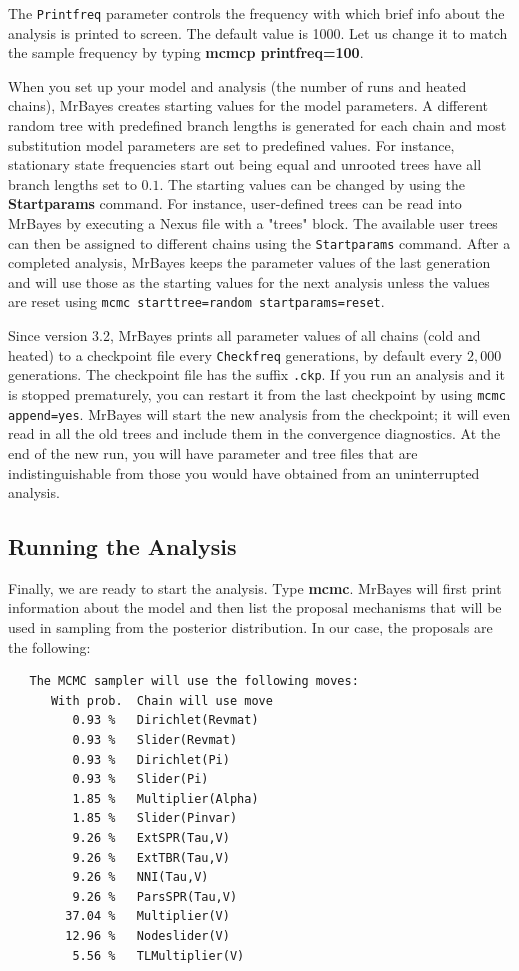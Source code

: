 \documentclass[12pt]{book}
\begin{document}
The \texttt{Printfreq} parameter controls the frequency with which brief info about the analysis is printed
 to screen. The default value is 1000. Let us change it to match the sample frequency by typing 
 \textbf{mcmcp printfreq=100}.

When you set up your model and analysis (the number of runs and heated chains), MrBayes creates starting
 values for the model parameters. A different random tree with predefined branch lengths is generated for
 each chain and most substitution model parameters are set to predefined values. For instance, stationary
 state frequencies start out being equal and unrooted trees have all branch lengths set to $0.1$. The 
 starting values can be changed by using the \textbf{Startparams} command. For instance, user-defined trees
 can be read into MrBayes by executing a Nexus file with a "trees" block. The available user trees can then
 be assigned to different chains using the \texttt{Startparams} command. After a completed analysis, MrBayes
 keeps the parameter values of the last generation and will use those as the starting values for the next
 analysis unless the values are reset using \texttt{mcmc starttree=random startparams=reset}.

Since version 3.2, MrBayes prints all parameter values of all chains (cold and heated) to a checkpoint file
 every \texttt{Checkfreq} generations, by default every $2,000$ generations. The checkpoint file has the
 suffix \texttt{.ckp}. If you run an analysis and it is stopped prematurely, you can restart it from the
 last checkpoint by using \texttt{mcmc append=yes}. MrBayes will start the new analysis from the checkpoint;
 it will even read in all the old trees and include them in the convergence diagnostics. At the end of the
 new run, you will have parameter and tree files that are indistinguishable from those you would have
 obtained from an uninterrupted analysis.

\subsection{Running the Analysis}

Finally, we are ready to start the analysis. Type \textbf{mcmc}. MrBayes will first print information about
 the model and then list the proposal mechanisms that will be used in sampling from the posterior 
 distribution. In our case, the proposals are the following:

\begin{singlespacing}
\small
\begin{verbatim}
   The MCMC sampler will use the following moves:
      With prob.  Chain will use move
         0.93 %   Dirichlet(Revmat)
         0.93 %   Slider(Revmat)
         0.93 %   Dirichlet(Pi)
         0.93 %   Slider(Pi)
         1.85 %   Multiplier(Alpha)
         1.85 %   Slider(Pinvar)
         9.26 %   ExtSPR(Tau,V)
         9.26 %   ExtTBR(Tau,V)
         9.26 %   NNI(Tau,V)
         9.26 %   ParsSPR(Tau,V)
        37.04 %   Multiplier(V)
        12.96 %   Nodeslider(V)
         5.56 %   TLMultiplier(V)
\end{verbatim}
\normalsize
\end{singlespacing}
\end{document}
